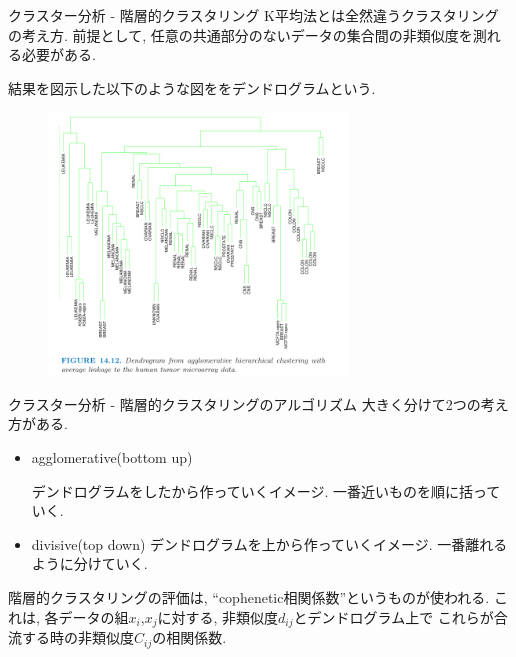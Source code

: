 \documentclass[dvipdfmx,8pt]{beamer}
\begin{document}
  \begin{frame}{クラスター分析 - 階層的クラスタリング}
    K平均法とは全然違うクラスタリングの考え方.
    前提として, 任意の共通部分のないデータの集合間の非類似度を測れる必要がある.

    結果を図示した以下のような図ををデンドログラムという.
    \begin{figure}[htb]
      \centering
      \includegraphics[width=8cm,clip]{images/dendrogram.png}
    \end{figure}
  \end{frame}
  \begin{frame}{クラスター分析 - 階層的クラスタリングのアルゴリズム}
    大きく分けて2つの考え方がある.
    \begin{itemize}
      \item agglomerative(bottom up)

      デンドログラムをしたから作っていくイメージ.
      一番近いものを順に括っていく.
      \item divisive(top down)
      デンドログラムを上から作っていくイメージ.
      一番離れるように分けていく.
    \end{itemize}

    階層的クラスタリングの評価は, ``cophenetic相関係数''というものが使われる.
    これは, 各データの組$x_i$,$x_j$に対する, 非類似度$d_{ij}$とデンドログラム上で
    これらが合流する時の非類似度$C_{ij}$の相関係数.
  \end{frame}
\end{document}
